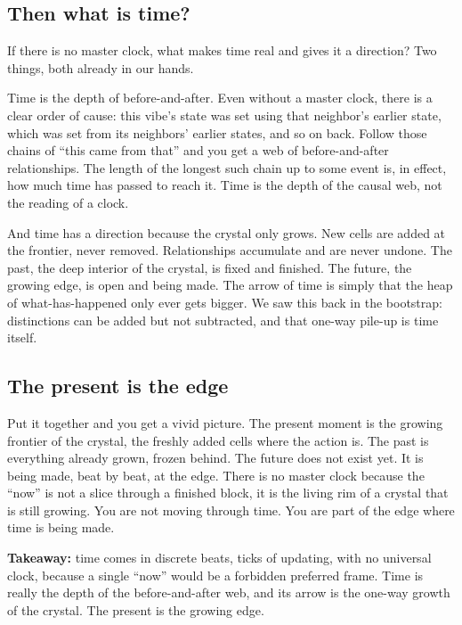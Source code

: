 \subsection{Then what is time?}

If there is no master clock, what makes time real and gives it a direction? Two things, both already in our hands.

Time is the depth of before-and-after. Even without a master clock, there is a clear order of cause: this vibe's state was set using that neighbor's earlier state, which was set from its neighbors' earlier states, and so on back. Follow those chains of ``this came from that'' and you get a web of before-and-after relationships. The length of the longest such chain up to some event is, in effect, how much time has passed to reach it. Time is the depth of the causal web, not the reading of a clock.

And time has a direction because the crystal only grows. New cells are added at the frontier, never removed. Relationships accumulate and are never undone. The past, the deep interior of the crystal, is fixed and finished. The future, the growing edge, is open and being made. The arrow of time is simply that the heap of what-has-happened only ever gets bigger. We saw this back in the bootstrap: distinctions can be added but not subtracted, and that one-way pile-up is time itself.

\subsection{The present is the edge}

Put it together and you get a vivid picture. The present moment is the growing frontier of the crystal, the freshly added cells where the action is. The past is everything already grown, frozen behind. The future does not exist yet. It is being made, beat by beat, at the edge. There is no master clock because the ``now'' is not a slice through a finished block, it is the living rim of a crystal that is still growing. You are not moving through time. You are part of the edge where time is being made.

\textbf{Takeaway:} time comes in discrete beats, ticks of updating, with no universal clock, because a single ``now'' would be a forbidden preferred frame. Time is really the depth of the before-and-after web, and its arrow is the one-way growth of the crystal. The present is the growing edge.
